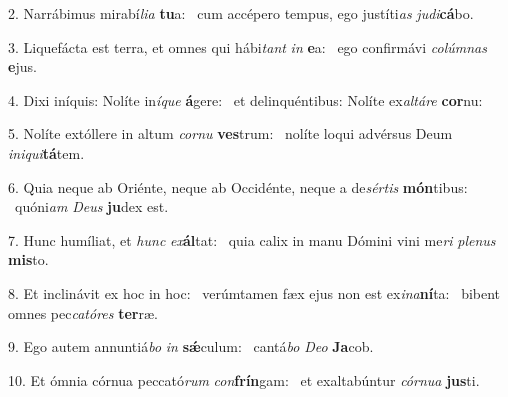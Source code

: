 2. Narrábimus mirabí\textit{li}\textit{a} \textbf{tu}a: \ast\  cum accépero tempus, ego justíti\textit{as} \textit{ju}\textit{di}\textbf{cá}bo.\

3. Liquefácta est terra, et omnes qui hábi\textit{tant} \textit{in} \textbf{e}a: \ast\  ego confirmávi \textit{co}\textit{lúm}\textit{nas} \textbf{e}jus.\

4. Dixi iníquis: Nolíte in\textit{í}\textit{que} \textbf{á}gere: \ast\  et delinquéntibus: Nolíte ex\textit{al}\textit{tá}\textit{re} \textbf{cor}nu:\

5. Nolíte extóllere in altum \textit{cor}\textit{nu} \textbf{ves}trum: \ast\  nolíte loqui advérsus Deum \textit{in}\textit{i}\textit{qui}\textbf{tá}tem.\

6. Quia neque ab Oriénte, neque ab Occidénte, neque a de\textit{sér}\textit{tis} \textbf{món}tibus: \ast\  quóni\textit{am} \textit{De}\textit{us} \textbf{ju}dex est.\

7. Hunc humíliat, et \textit{hunc} \textit{ex}\textbf{ál}tat: \ast\  quia calix in manu Dómini vini me\textit{ri} \textit{ple}\textit{nus} \textbf{mis}to.\

8. Et inclinávit ex hoc in hoc: \dag\  verúmtamen fæx ejus non est ex\textit{i}\textit{na}\textbf{ní}ta: \ast\  bibent omnes pec\textit{ca}\textit{tó}\textit{res} \textbf{ter}ræ.\

9. Ego autem annuntiá\textit{bo} \textit{in} \textbf{sǽ}culum: \ast\  cantá\textit{bo} \textit{De}\textit{o} \textbf{Ja}cob.\

10. Et ómnia córnua peccató\textit{rum} \textit{con}\textbf{frín}gam: \ast\  et exaltabúntur \textit{cór}\textit{nu}\textit{a} \textbf{jus}ti.\

